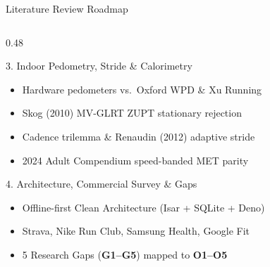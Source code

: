 \documentclass[aspectratio=169,10pt]{beamer}
\begin{document}
\begin{frame}{Literature Review Roadmap}
\begin{columns}[T]
\begin{column}{0.48\textwidth}
\begin{block}{3. Indoor Pedometry, Stride \& Calorimetry}
\begin{itemize}
          \item Hardware pedometers vs.\ Oxford WPD \& Xu Running
          \item Skog (2010) MV-GLRT ZUPT stationary rejection
          \item Cadence trilemma \& Renaudin (2012) adaptive stride
          \item 2024 Adult Compendium speed-banded MET parity
        \end{itemize}
      \end{block}
      \vspace{0.08cm}
      \begin{exampleblock}{4. Architecture, Commercial Survey \& Gaps}
        \begin{itemize}\footnotesize\itemsep 1pt
          \item Offline-first Clean Architecture (Isar + SQLite + Deno)
          \item Strava, Nike Run Club, Samsung Health, Google Fit
          \item 5 Research Gaps (\textbf{G1--G5}) mapped to \textbf{O1--O5}
        \end{itemize}
      \end{exampleblock}
    \end{column}
  \end{columns}
\end{frame}
\end{document}

